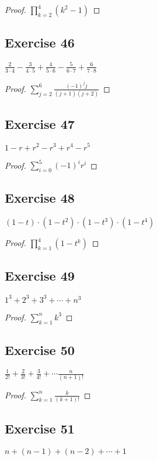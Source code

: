 \documentclass[14pt]{extarticle}
\newcommand{\dps}{\displaystyle}
\begin{document}
\begin{proof}
$\dps\prod_{k=2}^{4}(k^2-1)$
\end{proof}

\subsection{Exercise 46}
$\dps\frac{2}{3\cdot4} - \frac{3}{4\cdot5} + \frac{4}{5\cdot6} - \frac{5}{6\cdot7} + \frac{6}{7\cdot8}$

\begin{proof}
$\dps\sum_{j=2}^{6}\frac{(-1)^j j}{(j+1)(j+2)}$
\end{proof}

\subsection{Exercise 47}
$1 - r + r^2 - r^3 + r^4 - r^5$

\begin{proof}
$\dps\sum_{i = 0}^{5}(-1)^i r^i$
\end{proof}

\subsection{Exercise 48}
$(1 - t)\cdot(1 - t^2)\cdot(1 - t^3)\cdot(1 - t^4)$

\begin{proof}
$\dps\prod_{k=1}^{4}(1-t^k)$
\end{proof}

\subsection{Exercise 49}
$1^3 + 2^3 + 3^3 + \cdots + n^3$

\begin{proof}
$\dps\sum_{k=1}^{n}k^3$
\end{proof}

\subsection{Exercise 50}
$\dps \frac{1}{2!} + \frac{2}{3!} + \frac{3}{4!} + \cdots \frac{n}{(n+1)!}$

\begin{proof}
$\dps\sum_{k=1}^{n}\frac{k}{(k+1)!}$
\end{proof}

\subsection{Exercise 51}
$n + (n - 1) + (n - 2) + \cdots + 1$
\end{document}
